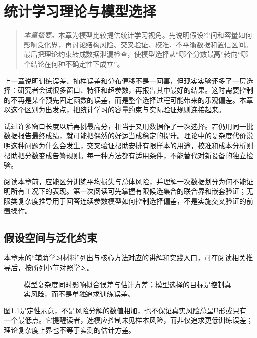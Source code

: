 \chapter{统计学习理论与模型选择}

\begin{quote}\small
\textit{本章摘要。}本章为模型比较提供统计学习视角。先说明假设空间和容量如何影响泛化界，再讨论结构风险、交叉验证、校准、不平衡数据和置信区间。最后把理论约束转成数据泄漏检查，使模型选择从“哪个分数最高”转向“哪个结论在何种不确定性下成立”。
\end{quote}

上一章说明训练误差、抽样误差和分布偏移不是一回事，但现实实验还多了一层选择：研究者会试很多窗口、特征和超参数，再报告其中最好的结果。这时需要控制的不再是某个预先固定函数的误差，而是整个选择过程可能带来的乐观偏差。本章以这个区别为出发点，把统计学习的容量约束与实际验证规则连接起来。

试过许多窗口长度以后再挑最高分，相当于又用数据作了一次选择。若仍用同一批数据报告最终成绩，就可能把偶然的好运当成稳定的提升。理论中的复杂度代价说明这种问题为什么会发生，交叉验证帮助安排有限样本的用途，校准和成本分析则帮助把分数变成告警规则。每一种方法都有适用条件，不能替代对新设备的独立检验。

阅读本章前，应能区分训练平均损失与总体风险，并理解一次数据划分为何不能证明所有工况下的表现。第一次阅读可先掌握有限候选集合的联合界和嵌套验证；无限类复杂度推导用于回答连续参数模型如何控制选择偏差，不是实施交叉验证的前置操作。

\section{假设空间与泛化约束}

本章末的“辅助学习材料”列出与核心方法对应的讲解和实践入口，可在阅读相关推导后，按所列小节对照学习。

\begin{figure}[htbp]
\centering
{}
\caption{模型复杂度同时影响拟合误差与估计方差；模型选择的目标是控制真实风险，而不是单独追求训练误差。}
\label{fig:statistical-complexity-tradeoff}
\end{figure}
图\ref{fig:statistical-complexity-tradeoff}是定性示意，不是风险分解的数值相加，也不保证真实风险总呈U形或只有一个最低点。它提醒读者，选模应控制未见样本风险，而非仅追求更低训练误差；理论复杂度上界也不等于实测的估计方差。
